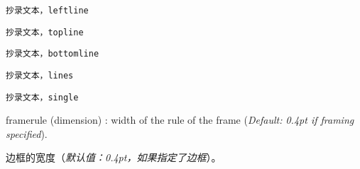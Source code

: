\documentclass[twoside]{article}
\makeatletter
\newcommand\cs[1]{\texttt{\textbackslash#1}}
\providecommand\optname[1]{\textsf{#1}}
\newenvironment{optlist}{\begin{description}%
  \renewcommand\makelabel[1]{%
    \descriptionlabel{\mdseries\optname{##1}}}%
  \itemsep0.25\itemsep}%
 {\end{description}}
\def\thinskip{\hskip 0.16667em\relax}
\def\endash{--}
\def\emdash{\endash-}
\def\d@sh#1#2{\unskip#1\thinskip#2\thinskip\ignorespaces}
\def\Dash{\d@sh\nobreak\emdash}
\makeatother
\begin{document}

\begin{SideBySideExample}
  \begin{Verbatim}[frame=leftline]
    抄录文本，leftline
  \end{Verbatim}
\end{SideBySideExample}

\begin{SideBySideExample}
  \begin{Verbatim}[frame=topline]
    抄录文本，topline
  \end{Verbatim}
\end{SideBySideExample}

\begin{SideBySideExample}
  \begin{Verbatim}[frame=bottomline]
    抄录文本，bottomline
  \end{Verbatim}
\end{SideBySideExample}

\begin{SideBySideExample}
  \begin{Verbatim}[frame=lines]
    抄录文本，lines
  \end{Verbatim}
\end{SideBySideExample}

\begin{SideBySideExample}
  \begin{Verbatim}[frame=single]
    抄录文本，single
  \end{Verbatim}
\end{SideBySideExample}

\begin{optlist}
  \item[framerule (dimension)]: width of the rule of the frame
  (\emph{Default: 0.4pt if framing specified}).

边框的宽度（\emph{默认值：0.4pt，如果指定了边框}）。
\end{optlist}

  
\end{document}
